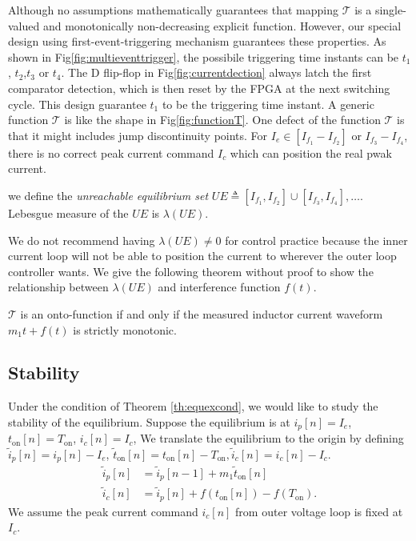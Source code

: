 Although no assumptions mathematically guarantees that mapping $\mathcal{T}$ is a single-valued and monotonically non-decreasing explicit function. However, our special design using first-event-triggering mechanism guarantees these properties.
As shown in Fig\;\ref{fig:multieventtrigger}, the possibile triggering time instants can be $t_1$, $t_2$,$t_3$ or $t_4$. The D flip-flop in Fig\;\ref{fig:currentdection} always latch the first comparator detection, which is then reset by the FPGA at the next switching cycle. This design guarantee $t_1$ to be the triggering time instant. A generic function $\mathcal{T}$ is like the shape in Fig\;\ref{fig:functionT}. 
One defect of the function $\mathcal{T}$ is that it might includes jump discontinuity points. For $I_e \in [I_{f_1}-I_{f_2}]$ or $I_{f_3}-I_{f_4}$, there is no correct peak current command $I_c$ which can position the real pwak current.
\begin{definition}
we define the \emph{unreachable equilibrium set} $U\!E \triangleq [I_{f_1},I_{f_2}] \cup [I_{f_3},I_{f_4}],\ldots$. Lebesgue measure of the $U\!E$ is $\lambda(U\!E)$.
\end{definition}
We do not recommend having $\lambda(U\!E) \neq 0$ for control practice because the inner current loop will not be able to position the current to wherever the outer loop controller wants. We give the following theorem without proof to show the relationship between $\lambda(U\!E)$ and interference function $f(t)$.
\begin{theorem} \label{th:equexcond}
$\mathcal{T}$ is an onto-function if and only if the measured inductor current waveform $m_1t+f(t)$ is strictly monotonic.
\end{theorem}
\subsection{Stability}
Under the condition of Theorem \ref{th:equexcond}, we would like to study the stability of the equilibrium. Suppose the equilibrium is at $i_p[n] = I_e$, $t_{\text{on}}[n]= T_{\text{on}}$, $i_c[n] = I_c$, 
We translate the equilibrium to the origin by defining $\tilde i_p[n] = i_{p}[n] - I_{e}$, $ \tilde t_{\text{on}}[n] = t_{\text{on}}[n] -  T_{\text{on}}, \tilde i_c[n] = i_c[n] - I_c$. 
\begin{align}  \label{ID1}
\tilde i_p[n] &= \tilde i_p[n-1] +  m_1 \tilde t_{\text{on}}[n] \\
\tilde i_c [n] &= \tilde i_p[n] +f(t_{\text{on}}[n]) - f(T_{\text{on}}).
\end{align}
We assume the peak current command $ i_c[n]$ from outer voltage loop is fixed at $I_{c}$. 

